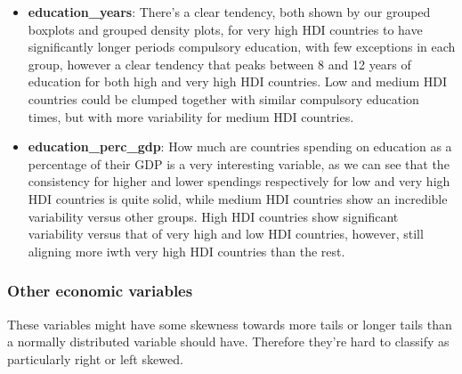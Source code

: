 \documentclass[]{article}
\providecommand{\tightlist}{%
  \setlength{\itemsep}{0pt}\setlength{\parskip}{0pt}}
\begin{document}
\begin{itemize}
\tightlist
\item
  \textbf{education\_years}: There's a clear tendency, both shown by our
  grouped boxplots and grouped density plots, for very high HDI
  countries to have significantly longer periods compulsory education,
  with few exceptions in each group, however a clear tendency that peaks
  between 8 and 12 years of education for both high and very high HDI
  countries. Low and medium HDI countries could be clumped together with
  similar compulsory education times, but with more variability for
  medium HDI countries.
\item
  \textbf{education\_perc\_gdp}: How much are countries spending on
  education as a percentage of their GDP is a very interesting variable,
  as we can see that the consistency for higher and lower spendings
  respectively for low and very high HDI countries is quite solid, while
  medium HDI countries show an incredible variability versus other
  groups. High HDI countries show significant variability versus that of
  very high and low HDI countries, however, still aligning more iwth
  very high HDI countries than the rest.
\end{itemize}

\hypertarget{other-economic-variables}{%
\subsubsection{Other economic
variables}\label{other-economic-variables}}

These variables might have some skewness towards more tails or longer
tails than a normally distributed variable should have. Therefore
they're hard to classify as particularly right or left skewed.
\end{document}
